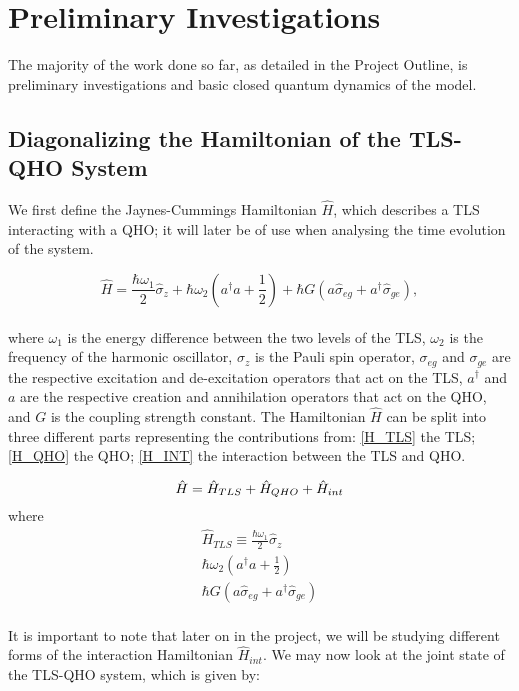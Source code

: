 \documentclass[12pt,a4paper]{article}
\begin{document}
{\section{Preliminary Investigations}}
The majority of the work done so far, as detailed in the Project Outline, is preliminary investigations and basic closed quantum dynamics of the model. 
\\
\subsection{\normalsize{Diagonalizing the Hamiltonian of the TLS-QHO System}}

We first define the Jaynes-Cummings\cite{H_JC_friction} Hamiltonian\cite{C_spin-boson} $\hat{H}$, which describes a TLS interacting with a QHO; it will later be of use when analysing the time evolution of the system. 

\begin{equation}
    \hat{H} = \frac{\hbar\omega_1}{2}\hat{\sigma}_z + \hbar\omega_2(a^\dagger a + \frac{1}{2}) + \hbar G(a\hat{\sigma}_{eg} + a^\dagger\hat{\sigma}_{ge}),
\end{equation}
\\
where $\omega_1$ is the energy difference between the two levels of the TLS, $\omega_2$ is the frequency of the harmonic oscillator, $\sigma_z$ is the Pauli spin operator, $\sigma_{eg}$ and $\sigma_{ge}$ are the respective excitation and de-excitation operators that act on the TLS, $a^\dagger$ and $a$ are the respective creation and annihilation operators that act on the QHO, and $G$ is the coupling strength constant. The Hamiltonian $\hat{H}$ can be split into three different parts representing the contributions from: \eqref{H_TLS} the TLS; \eqref{H_QHO} the QHO; \eqref{H_INT} the interaction between the TLS and QHO. 

\begin{equation*}
    \hat{H} = \hat{H}_{TLS} + \hat{H}_{QHO} + \hat{H}_{int}\\
\end{equation*}
where 
\begin{align}
    \hat{H}_{TLS}\equiv \frac{\hbar\omega_1}{2}\hat{\sigma}_z\label{H_TLS}\\
    \hbar\omega_2(a^\dagger a + \frac{1}{2})\label{H_QHO}\\
    \hbar G(a\hat{\sigma}_{eg} + a^\dagger\hat{\sigma}_{ge})\label{H_INT}
\end{align}
\\
It is important to note that later on in the project, we will be studying different forms of the interaction Hamiltonian $\hat{H}_{int}$.
We may now look at the joint state of the TLS-QHO system, which is given by:
\end{document}
